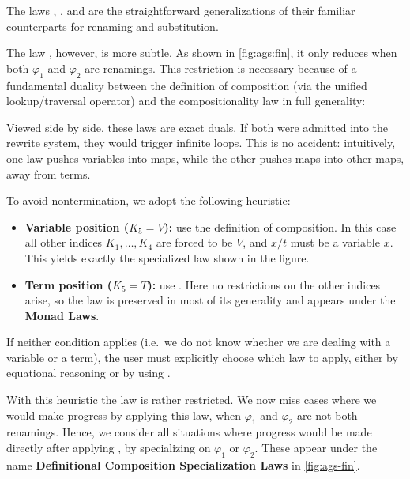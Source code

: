 \documentclass[screen,nonacm]{acmart}
\begin{document}
The laws , , and  are
the straightforward generalizations of their familiar counterparts for renaming
and substitution.

The law , however, is more subtle. As shown in
\cref{fig:ags:fin}, it only reduces when both $\varphi_1$ and $\varphi_2$ are
renamings. This restriction is necessary because of a fundamental duality
between the definition of composition (via the unified lookup/traversal
operator) and the compositionality law in full generality:

\begin{minipage}{0.48\linewidth}
      \raggedright{}
      \ECompGeneral{}
\end{minipage}
\begin{minipage}{0.48\linewidth}
      \raggedright{}
      \ECompoGeneral{}
\end{minipage}

Viewed side by side, these laws are exact duals. If both were admitted into the
rewrite system, they would trigger infinite loops. This is no accident:
intuitively, one law pushes variables into maps, while the other pushes maps
into other maps, away from terms.

To avoid nontermination, we adopt the following heuristic:
\begin{itemize}
      \item \textbf{Variable position ($K_5 = V$):} use the definition of
            composition. In this case all other indices $K_1,\dots,K_4$ are forced
            to be $V$, and $x/t$ must be a variable $x$. This yields exactly the
            specialized  law shown in the figure.
      \item \textbf{Term position ($K_5 = T$):} use . Here no
            restrictions on the other indices arise, so the law is preserved in
            most of its generality and appears under the  \textbf{Monad Laws}.
\end{itemize}

\noindent If neither condition applies (i.e.\ we do not know whether we are dealing with
a variable or a term), the user must explicitly choose which law to apply,
either by equational reasoning or by using .

With this heuristic the  law is rather restricted. We now
miss cases where we would make progress by applying this law, when $\varphi_1$
and $\varphi_2$ are not both renamings. Hence, we consider all situations where
progress would be made directly after applying , by
specializing on $\varphi_1$ or $\varphi_2$. These appear under the name
\textbf{Definitional Composition Specialization Laws} in \cref{fig:ags-fin}.
\end{document}

